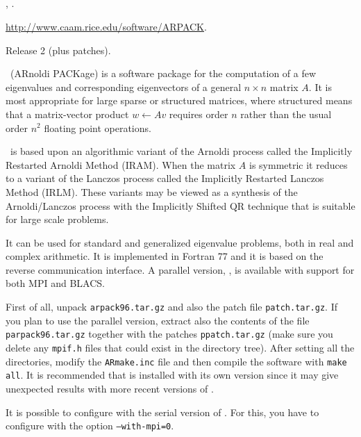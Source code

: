 \subsection*{\underline{\arpack}}
	\begin{description}
	\setlength{\itemsep}{0pt}
	\item[References.]\citep{Lehoucq:1998:AUG}, \citep{Maschhoff:1996:PEP}.
	\item[Website.] \url{http://www.caam.rice.edu/software/ARPACK}.
	\item[Version.] Release 2 (plus patches).
	\item[Summary.] \arpack\ (ARnoldi PACKage) is a software package for the computation of a few eigenvalues and corresponding eigenvectors of a general $n\times n$ matrix $A$. It is most appropriate for large sparse or structured matrices, where structured means that a matrix-vector product $w \leftarrow Av$ requires order $n$ rather than the usual order $n^2$ floating point operations. 
	
	\arpack\ is based upon an algorithmic variant of the Arnoldi process called the Implicitly Restarted Arnoldi Method (IRAM). When the matrix $A$ is symmetric it reduces to a variant of the Lanczos process called the Implicitly Restarted Lanczos Method (IRLM). These variants may be viewed as a synthesis of the Arnoldi/Lanczos process with the Implicitly Shifted QR technique that is suitable for large scale problems. 

	It can be used for standard and generalized eigenvalue problems, both in real and complex arithmetic. It is implemented in Fortran 77 and it is based on the reverse communication interface. A parallel version, \parpack, is available with support for both MPI and BLACS.
	\item[Installation.]
	First of all, unpack \texttt{arpack96.tar.gz} and also the patch file \texttt{patch.tar.gz}. If you plan to use the parallel version, extract also the contents of the file \texttt{parpack96.tar.gz} together with the patches \texttt{ppatch.tar.gz} (make sure you delete any \texttt{mpif.h} files that could exist in the directory tree). After setting all the directories, modify the \texttt{ARmake.inc} file and then compile the software with \texttt{make all}. It is recommended that \arpack is installed with its own \lapack version since it may give unexpected results with more recent versions of \lapack. 

	It is possible to configure \slepc with the serial version of \arpack. For this, you have to configure \petsc with the option \texttt{--with-mpi=0}.
	\end{description}

